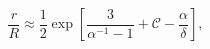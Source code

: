\begin{equation}
\frac rR \approx\frac12\exp\left[\frac3{\alpha^{-1}-1}+{\mathcal{C}}-\frac{\alpha}
{\delta}\right],
\label{44}
\end{equation}

